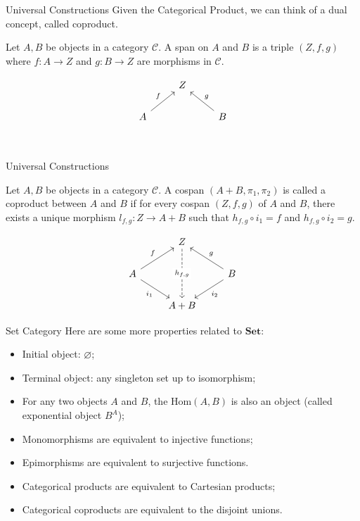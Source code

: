 \documentclass[aspectratio=169,xcolor=dvipsnames,10pt]{beamer}
\theoremstyle{definition}
\begin{document}
\begin{frame}[fragile]{Universal Constructions}
    Given the Categorical Product, we can think of a dual concept, called coproduct.
	\begin{definition}[Cospan]
        Let $A,B$ be objects in a  category $\mathcal C$. A span
        on $A$ and $B$ is a triple $(Z,f,g)$ where $f:A\to Z$ and
        $g:B\to Z$ are morphisms in $\mathcal C$.
	\end{definition}
    \[\begin{tikzcd}
        & Z \\
        A && B \\
        \arrow["f", from=2-1, to=1-2]
        \arrow["g"', from=2-3, to=1-2]
    \end{tikzcd}\]
\end{frame}

\begin{frame}[fragile]{Universal Constructions}
    \begin{definition}
        Let $A,B$ be objects in a  category $\mathcal C$. A cospan $(A + B, \pi_1, \pi_2)$
        is called a coproduct between $A$ and $B$ if for every cospan $(Z, f, g)$ of $A$ and $B$,
        there exists a unique morphism $l_{f,g}:Z \to A + B$ such that
        $h_{f,g} \circ i_1 = f$ and $h_{f,g} \circ i_2 = g$.
    \end{definition}
    \[\begin{tikzcd}
        & Z \\
        A && B \\
        & {A + B}
        \arrow["{h_{f,g}}"{description}, dashed, from=1-2, to=3-2]
        \arrow["f", from=2-1, to=1-2]
        \arrow["{i_1}"', from=2-1, to=3-2]
        \arrow["g"', from=2-3, to=1-2]
        \arrow["{i_2}", from=2-3, to=3-2]
    \end{tikzcd}\]
\end{frame}

\begin{frame}[fragile]{Set Category}
    Here are some more properties related to $\mathbf{Set}$:
    \begin{itemize}
        \item Initial object: $\varnothing$;
        \item Terminal object: any singleton set up to isomorphism;
        \item For any two objects $A$ and $B$, the $\text{Hom}(A,B)$ is also an object (called exponential object $B^A$);
        \item Monomorphisms are equivalent to injective functions;
        \item Epimorphisms are equivalent to surjective functions.
        \item Categorical products are equivalent to Cartesian products;
        \item Categorical coproducts are equivalent to the disjoint unions.
    \end{itemize}
\end{frame}
\end{document}
